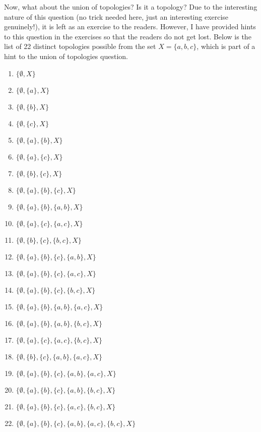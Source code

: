 \noindent Now, what about the union of topologies? Is it a topology? Due to the interesting nature of this question (no trick needed here, just an interesting exercise genuinely!), it is left as an exercise to the readers. However, I have provided hints to this question in the exercises so that the readers do not get lost. Below is the list of 22 distinct topologies possible from the set $X=\{a,b,c\}$, which is part of a hint to the union of topologies question.
\begin{multicols}{2}
\begin{enumerate}
  \item \(\{\emptyset, X\}\)
  \item \(\{\emptyset, \{a\}, X\}\)
  \item \(\{\emptyset, \{b\}, X\}\)
  \item \(\{\emptyset, \{c\}, X\}\)
  \item \(\{\emptyset, \{a\}, \{b\}, X\}\)
  \item \(\{\emptyset, \{a\}, \{c\}, X\}\)
  \item \(\{\emptyset, \{b\}, \{c\}, X\}\)
  \item \(\{\emptyset, \{a\}, \{b\}, \{c\}, X\}\)
  \item \(\{\emptyset, \{a\}, \{b\}, \{a,b\}, X\}\)
  \item \(\{\emptyset, \{a\}, \{c\}, \{a,c\}, X\}\)
  \item \(\{\emptyset, \{b\}, \{c\}, \{b,c\}, X\}\)
  \item \(\{\emptyset, \{a\}, \{b\}, \{c\}, \{a,b\}, X\}\)
  \item \(\{\emptyset, \{a\}, \{b\}, \{c\}, \{a,c\}, X\}\)
  \item \(\{\emptyset, \{a\}, \{b\}, \{c\}, \{b,c\}, X\}\)
  \item \(\{\emptyset, \{a\}, \{b\}, \{a,b\}, \{a,c\}, X\}\)
  \item \(\{\emptyset, \{a\}, \{b\}, \{a,b\}, \{b,c\}, X\}\)
  \item \(\{\emptyset, \{a\}, \{c\}, \{a,c\}, \{b,c\}, X\}\)
  \item \(\{\emptyset, \{b\}, \{c\}, \{a,b\}, \{a,c\}, X\}\)
  \item \(\{\emptyset, \{a\}, \{b\}, \{c\}, \{a,b\}, \{a,c\}, X\}\)
  \item \(\{\emptyset, \{a\}, \{b\}, \{c\}, \{a,b\}, \{b,c\}, X\}\)
  \item \(\{\emptyset, \{a\}, \{b\}, \{c\}, \{a,c\}, \{b,c\}, X\}\)
  \item \(\{\emptyset, \{a\}, \{b\}, \{c\}, \{a,b\}, \{a,c\}, \{b,c\}, X\}\)
\end{enumerate}
\end{multicols}
